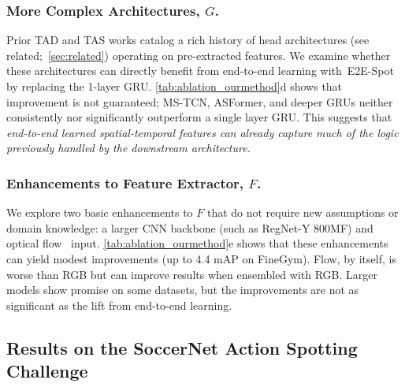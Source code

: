 \documentclass[runningheads]{llncs}
\newcommand{\notation}[1]{\ensuremath{#1}\xspace}
\newcommand{\OURMETHOD}{{E2E-Spot}\xspace}
\newcommand{\finegym}{{FineGym}\xspace}
\newcommand{\FeatureExtractor}{\notation{F}}
\newcommand{\TemporalArchitecture}{\notation{G}}
\begin{document}
\subsubsection*{More Complex Architectures, $\TemporalArchitecture$.}
Prior TAD and TAS works catalog a rich history of head architectures (see related;~\autoref{sec:related}) operating on pre-extracted features.
We examine whether these architectures can directly benefit from end-to-end learning with~\OURMETHOD by replacing the 1-layer GRU.
\autoref{tab:ablation_ourmethod}d shows that improvement is not guaranteed; MS-TCN, ASFormer, and deeper GRUs neither consistently nor significantly outperform a single layer GRU.
This suggests that \emph{end-to-end learned spatial-temporal features can already capture much of the logic previously handled by the downstream architecture.}

\subsubsection*{Enhancements to Feature Extractor, $\FeatureExtractor$.}
We explore two basic enhancements to $\FeatureExtractor$ that do not require new assumptions or domain knowledge: a larger CNN backbone (such as RegNet-Y 800MF) and optical flow~\cite{raft} input.
\autoref{tab:ablation_ourmethod}e shows that these enhancements can yield modest improvements (up to 4.4 mAP on \finegym).
Flow, by itself, is worse than RGB but can improve results when ensembled with RGB.
Larger models show promise on some datasets, but
the improvements are not as significant as the lift from end-to-end learning.

\subsection{Results on the SoccerNet Action Spotting Challenge}
\label{sub:coarse_spotting}
\end{document}
